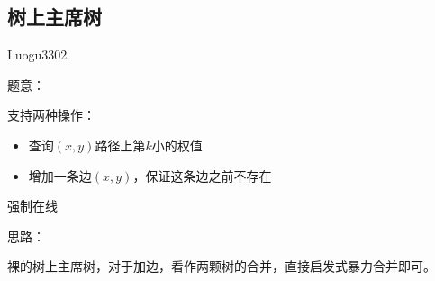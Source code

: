 \subsection{树上主席树}
Luogu3302\par
题意：\par
支持两种操作：\par
\begin{itemize}
\item 查询$(x, y)$路径上第$k$小的权值
\item 增加一条边$(x, y)$，保证这条边之前不存在
\end{itemize} \par
强制在线\par
思路：\par
裸的树上主席树，对于加边，看作两颗树的合并，直接启发式暴力合并即可。\par
